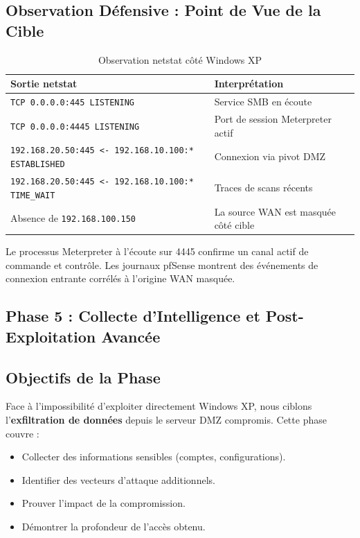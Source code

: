 \documentclass[12pt,a4paper,openany]{report}
\newcommand{\tableheadcolor}{\rowcolor{tableheadbg}}
\begin{document}
	\subsection{Observation Défensive : Point de Vue de la Cible}
	\begin{table}[H]
		\centering
		\renewcommand{\arraystretch}{1.4}
		\setlength{\arrayrulewidth}{0.5pt}
		\begin{tabular}{p{6cm} p{7cm}}
			\arrayrulecolor{tableborder}
			\hline
			\tableheadcolor
			\textcolor{tableheadfg}{\textbf{Sortie netstat}} &
			\textcolor{tableheadfg}{\textbf{Interprétation}} \\
			\hline
			\rowcolor{tablerowalt}
			\texttt{TCP 0.0.0.0:445 LISTENING} & Service SMB en écoute \\
			\texttt{TCP 0.0.0.0:4445 LISTENING} & Port de session Meterpreter actif \\
			\rowcolor{tablerowalt}
			\texttt{192.168.20.50:445 <- 192.168.10.100:* ESTABLISHED} & Connexion via pivot DMZ \\
			\texttt{192.168.20.50:445 <- 192.168.10.100:* TIME\_WAIT} & Traces de scans récents \\
			\rowcolor{tablerowalt}
			Absence de \texttt{192.168.100.150} & La source WAN est masquée côté cible \\
			\hline
		\end{tabular}
		\caption{Observation netstat côté Windows XP}
		\label{tab:windows-netstat-observation}
	\end{table}
	
	Le processus Meterpreter à l'écoute sur 4445 confirme un canal actif de commande et contrôle.
	Les journaux pfSense montrent des événements de connexion entrante corrélés à l'origine WAN masquée.
	
	\subsection{Phase 5 : Collecte d'Intelligence et Post-Exploitation Avancée}
	
	\subsection{Objectifs de la Phase}
	
	Face à l'impossibilité d'exploiter directement Windows XP, nous ciblons l'\textbf{exfiltration de données} depuis le serveur DMZ compromis. Cette phase couvre :
	\begin{itemize}
		\item Collecter des informations sensibles (comptes, configurations).
		\item Identifier des vecteurs d'attaque additionnels.
		\item Prouver l'impact de la compromission.
		\item Démontrer la profondeur de l'accès obtenu.
	\end{itemize}
	
\end{document}
